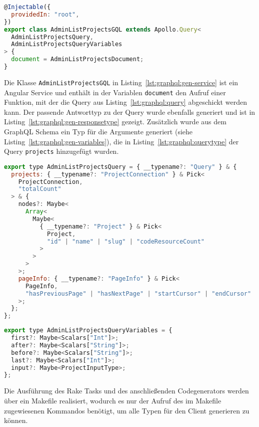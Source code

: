 \begin{lstlisting}[language=JavaScript,float=h!,caption={Generierter Service enthält den Aufruf der Query als Instanzvariable}, label={lst:graphql:gen-service}]
@Injectable({
  providedIn: "root",
})
export class AdminListProjectsGQL extends Apollo.Query<
  AdminListProjectsQuery,
  AdminListProjectsQueryVariables
> {
  document = AdminListProjectsDocument;
}
\end{lstlisting}

Die Klasse \texttt{AdminListProjectsGQL} in Listing~\ref{lst:graphql:gen-service} ist ein Angular Service und enthält in der Variablen \texttt{document} den Aufruf einer Funktion, mit der die Query aus Listing~\ref{lst:graphql:query} abgeschickt werden kann. Der passende Antworttyp zu der Query wurde ebenfalls generiert und ist in Listing~\ref{lst:graphql:gen-responsetype} gezeigt. Zusätzlich wurde aus dem GraphQL Schema ein Typ für die Argumente generiert (siehe Listing~\ref{lst:graphql:gen-variables}), die in Listing~\ref{lst:graphql:querytype} der Query \texttt{projects} hinzugefügt wurden.

\begin{lstlisting}[language=JavaScript,float=h!,caption={Generierter Antworttyp}, label={lst:graphql:gen-responsetype}]
export type AdminListProjectsQuery = { __typename?: "Query" } & {
  projects: { __typename?: "ProjectConnection" } & Pick<
    ProjectConnection,
    "totalCount"
  > & {
    nodes?: Maybe<
      Array<
        Maybe<
          { __typename?: "Project" } & Pick<
            Project,
            "id" | "name" | "slug" | "codeResourceCount"
          >
        >
      >
    >;
    pageInfo: { __typename?: "PageInfo" } & Pick<
      PageInfo,
      "hasPreviousPage" | "hasNextPage" | "startCursor" | "endCursor"
    >;
  };
};
\end{lstlisting}



\begin{lstlisting}[language=JavaScript,float=h!,caption={Generierter Parametertyp}, label={lst:graphql:gen-variables}]
export type AdminListProjectsQueryVariables = {
  first?: Maybe<Scalars["Int"]>;
  after?: Maybe<Scalars["String"]>;
  before?: Maybe<Scalars["String"]>;
  last?: Maybe<Scalars["Int"]>;
  input?: Maybe<ProjectInputType>;
};
\end{lstlisting}


Die Ausführung des Rake Tasks und des anschließenden Codegenerators werden über ein Makefile realisiert, wodurch es nur der Aufruf des im Makefile zugewiesenen Kommandos benötigt, um alle Typen für den Client generieren zu können. 

